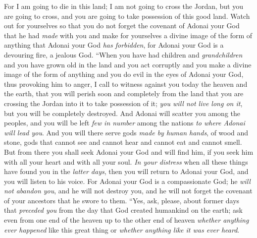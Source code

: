 \begin{biblechapter}
\verse For I am going to die in this land; I am not going to cross the Jordan, but you are going to cross, and you are going to take possession of this good land.
\verse Watch out for yourselves so that you do not forget the covenant of Adonai your God that he had \textit{made} with you and make for yourselves a divine image of the form of anything that Adonai your God \textit{has forbidden},
\verse for Adonai your God is a devouring fire, a jealous God.
\verse “When you have had children and \textit{grandchildren} and you have grown old in the land and you act corruptly and you make a divine image of the form of anything and you do evil in the eyes of Adonai your God, thus provoking him to anger,
\verse I call to witness against you today the heaven and the earth, that you will perish soon and completely from the land that you are crossing the Jordan into it to take possession of it; \textit{you will not live long on it}, but you will be completely destroyed.
\verse And Adonai will scatter you among the peoples, and you will be left \textit{few in number} among the nations \textit{to where Adonai will lead you}.
\verse And you will there serve gods \textit{made by human hands}, of wood and stone, gods that cannot see and cannot hear and cannot eat and cannot smell.
\verse But from there you shall seek Adonai your God and will find him, if you seek him with all your heart and with all your soul.
\verse \textit{In your distress} when all these things have found you in the \textit{latter days}, then you will return to Adonai your God, and you will listen to his voice.
\verse For Adonai your God is a compassionate God; he \textit{will not abandon you}, and he will not destroy you, and he will not forget the covenant of your ancestors that he swore to them.
\verse “Yes, ask, please, about former days that \textit{preceded you} from the day that God created humankind on the earth; ask even from one end of the heaven up to the other end of heaven \textit{whether anything ever happened} like this great thing or \textit{whether anything like it was ever heard}.

\end{biblechapter}
